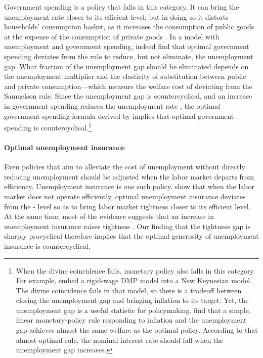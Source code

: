 \documentclass[letterpaper,12pt,leqno]{article}
\begin{document}
Government spending is a policy that falls in this category. It can bring the unemployment rate closer to its efficient level; but in doing so it distorts households' consumption basket, as it increases the consumption of public goods at the expense of the consumption of private goods . In a model with unemployment and government spending,  indeed find that optimal government spending deviates from the  rule to reduce, but not eliminate, the unemployment gap. What fraction of the unemployment gap should be eliminated depends on the unemployment multiplier and the elasticity of substitution between public and private consumption---which measure the welfare cost of deviating from the Samuelson rule. Since the unemployment gap is countercyclical, and an increase in government spending reduces the unemployment rate , the optimal government-spending formula derived by  implies that optimal government spending is countercyclical.\footnote{When the divine coincidence fails, monetary policy also falls in this category. For example,  embed a rigid-wage DMP model into a New Keynesian model. The divine coincidence fails in that model, so there is a tradeoff between closing the unemployment gap and bringing inflation to its target. Yet, the unemployment gap is a useful statistic for policymaking.  find that a simple, linear monetary-policy rule responding to inflation and the unemployment gap achieves almost the same welfare as the optimal policy. According to that almost-optimal rule, the nominal interest rate should fall when the unemployment gap increases.}

\paragraph{Optimal unemployment insurance} Even policies that aim to alleviate the cost of unemployment without directly reducing unemployment should be adjusted when the labor market departs from efficiency. Unemployment insurance is one such policy.  show that when the labor market does not operate efficiently, optimal unemployment insurance deviates from the - level so as to bring labor market tightness closer to its efficient level. At the same time, most of the evidence suggests that an increase in unemployment insurance raises tightness . Our finding that the tightness gap is sharply procyclical therefore implies that the optimal generosity of unemployment insurance is countercyclical.
\end{document}
